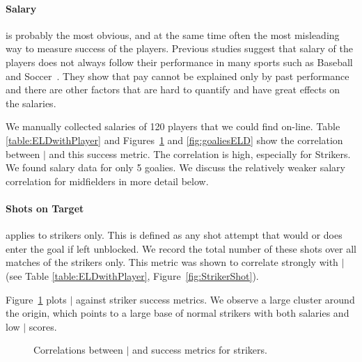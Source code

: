 {	\paragraph{Salary} is probably the most obvious, and at the same time often the most misleading way to measure success of the players. Previous studies suggest that salary of the players does not  always follow their performance in many sports such as Baseball and Soccer~\citep{Hall2002,Barrio2004}. They show that pay cannot be explained only by past performance and there are other factors that are hard to quantify and have great effects on the salaries. 
	
	 We manually collected salaries of 120 players that we could find on-line. Table \ref{table:ELDwithPlayer}  and Figures~\ref{fig:strikersELD} and \ref{fig:goaliesELD} show the correlation between $\mid$ and this success metric. The correlation is high, especially for Strikers. We found salary data for only 5 goalies. We discuss the relatively weaker salary correlation for midfielders in more detail below.
	 
	 \paragraph{Shots on Target} applies to strikers only. This is defined as any shot attempt that would or does enter the goal if left unblocked. We record the total number of these shots over all matches of the strikers only. This metric was shown to correlate strongly with $\mid$ (see Table \ref{table:ELDwithPlayer}, Figure~\ref{fig:StrikerShot}).
	 
	 Figure~\ref{fig:strikersELD} plots $\mid$ against striker success metrics.   We observe a large cluster around the origin, which points to a large base of normal strikers with both salaries and low $\mid$ scores. %
	 


	\begin{figure}
		\centering     %
		\caption{Correlations between $\mid$ and success metrics for strikers\label{fig:strikersELD}.}
	\end{figure}


}
